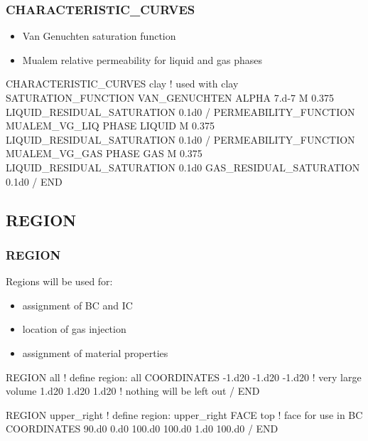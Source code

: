 \documentclass{beamer}
\newcommand\redcomment[1]{{{\color{red} #1}}}
\newcommand\bluecomment[1]{{{\color{blue} #1}}}
\newcommand\greencomment[1]{{{\color{green} #1}}}
\begin{document}
\begin{frame}\frametitle{CHARACTERISTIC\_CURVES}

\begin{itemize}\small
  \item Van Genuchten \redcomment{saturation function}
  \item Mualem \redcomment{relative permeability} for liquid and gas phases
\end{itemize}

\begin{semiverbatim}\small
CHARACTERISTIC_CURVES clay \bluecomment{! used with} \greencomment{clay}
  SATURATION_FUNCTION VAN_GENUCHTEN
    ALPHA 7.d-7
    M 0.375
    LIQUID_RESIDUAL_SATURATION 0.1d0
  /
  PERMEABILITY_FUNCTION MUALEM_VG_LIQ
    PHASE LIQUID
    M 0.375
    LIQUID_RESIDUAL_SATURATION 0.1d0
  /
  PERMEABILITY_FUNCTION MUALEM_VG_GAS
    PHASE GAS
    M 0.375
    LIQUID_RESIDUAL_SATURATION 0.1d0
    GAS_RESIDUAL_SATURATION 0.1d0
  /
END
\end{semiverbatim}

\end{frame}
\subsection{REGION}

\begin{frame}[fragile]\frametitle{REGION}
Regions will be used for:
\begin{itemize}
  \item{assignment of \redcomment{BC} and \redcomment{IC}}
  \item{location of \redcomment{gas injection}}
  \item{assignment of \redcomment{material properties}}
\end{itemize}

\begin{semiverbatim}\small
REGION all               \bluecomment{! define region:} \greencomment{all}
  COORDINATES
    -1.d20 -1.d20 -1.d20 \bluecomment{! very large volume}
     1.d20  1.d20  1.d20 \bluecomment{! nothing will be left out}
  /
END

REGION upper_right       \bluecomment{! define region:} \greencomment{upper_right}
  FACE top               \bluecomment{! face for use in BC}
  COORDINATES
    90.d0 0.d0 100.d0
    100.d0 1.d0 100.d0
  /
END
\end{semiverbatim}
\end{frame}
\end{document}
